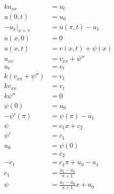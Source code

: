 \documentclass{article}
\begin{document}
\begin{align*}
  k u_{x x}            & = u_t                               \\
  u(0, t)              & = u_0                               \\
  -u_x|_{x = \pi}      & = u(\pi, t) - u_1                   \\
  u(x, 0)              & = 0                                 \\
  u(x, t)              & = v(x, t) + \psi(x)                 \\
  u_{x x}              & = v_{x x} + \psi''                  \\
  u_t                  & = v_t                               \\
  k (v_{x x} + \psi'') & = v_t                               \\
  k v_{x x}            & = v_t                               \\
  k \psi''             & = 0                                 \\
  \psi(0)              & = u_0                               \\
  -\psi'(\pi)          & = \psi(\pi) - u_1                   \\
  \psi                 & = c_1 x + c_2                       \\
  \psi'                & = c_1                               \\
  u_0                  & = \psi(0)                           \\
                       & = c_2                               \\
  -c_1                 & = c_1 \pi + u_0 - u_1               \\
  c_1                  & = \frac{u_1 - u_0}{\pi + 1}         \\
  \psi                 & = \frac{u_1 - u_0}{\pi + 1} x + u_0
\end{align*}

\setcounter{subsubsection}{6}
\subsubsection{}
\end{document}
